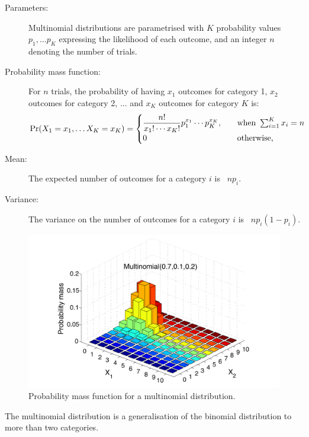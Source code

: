 \begin{description}
\item [Parameters: ] Multinomial distributions are parametrised with $K$ probability values $p_1,...p_K$ expressing the likelihood of each outcome, and an integer $n$ denoting the number of trials.

\item [Probability mass function: ] For $n$ trials,  the probability of having $x_1$ outcomes for category 1, $x_2$ outcomes for category 2, ... and $x_K$ outcomes for category $K$ is:
\begin{align}
\Pr(X_1 = x_1,\dots X_K = x_K)  = \begin{cases} { \displaystyle {n! \over x_1!\cdots x_K!}p_1^{x_1}\cdots p_K^{x_K}}, \quad &
\mbox{when } \sum_{i=1}^K x_i=n \\
0 & \mbox{otherwise,} \end{cases}
\end{align} 
\item [Mean: ] The expected number of outcomes for a category $i$ is \ $ n p_i$.

\item [Variance: ] The variance on the number of outcomes for a category $i$ is \ $n  p_i (1-p_i)$.
\end{description}

\begin{figure}[h!]
\centering
\includegraphics[scale=0.40]{imgs/multinomial_appendix.pdf}
\caption{Probability mass function for a multinomial distribution.} 
\label{fig:multinomial-appendix}
\end{figure}

The multinomial distribution is a generalisation of the binomial distribution to more than two categories.

